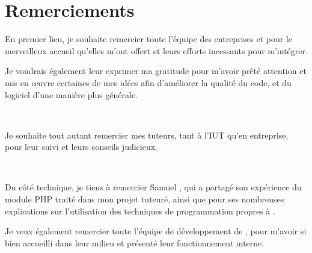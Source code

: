 \chapter*{Remerciements}
En premier lieu, je souhaite remercier toute l'équipe des entreprises \solulog{} et \fidit{} pour le merveilleux accueil qu'elles m'ont offert et leurs efforts incessants pour m'intégrer.

Je voudrais également leur exprimer ma gratitude pour m'avoir prêté attention et mis en \oe{uvre} certaines de mes idées afin d'améliorer la qualité du code, et du logiciel d'une manière plus générale.

~

Je souhaite tout autant remercier mes tuteurs, tant à l'IUT qu'en entreprise, pour leur suivi et leurs conseils judicieux.

~

Du côté technique, je tiens à remercier Samuel , qui a partagé son expérience du module PHP traité dans mon projet tuteuré, ainsi que pour ses nombreuses explications sur l'utilisation des techniques de programmation propres à \solulog.

Je veux également remercier toute l'équipe de développement de \fidit, pour m'avoir si bien accueilli dans leur milieu et présenté leur fonctionnement interne.
